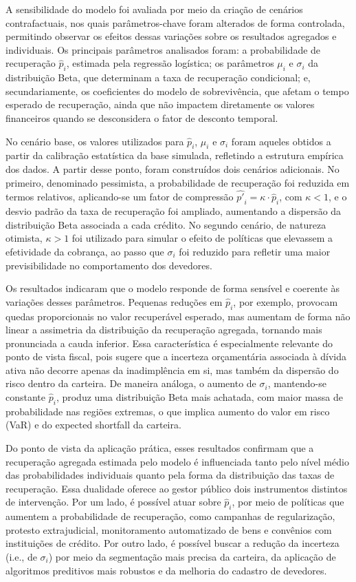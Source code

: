 \documentclass[a4paper,12pt]{article}
\begin{document}
A sensibilidade do modelo foi avaliada por meio da criação de cenários contrafactuais, nos quais parâmetros-chave foram alterados de forma controlada, permitindo observar os efeitos dessas variações sobre os resultados agregados e individuais. Os principais parâmetros analisados foram: a probabilidade de recuperação 
 $\hat{p}_{i}$, estimada pela regressão logística; os parâmetros $\mu_{i}$ e $\sigma_{i}$ da distribuição Beta, que determinam a taxa de recuperação condicional; e, secundariamente, os coeficientes do modelo de sobrevivência, que afetam o tempo esperado de recuperação, ainda que não impactem diretamente os valores financeiros quando se desconsidera o fator de desconto temporal.

No cenário base, os valores utilizados para $\hat{p}_{i}$, $\mu_{i}$ e $\sigma_{i}$ foram aqueles obtidos a partir da calibração estatística da base simulada, refletindo a estrutura empírica dos dados. A partir desse ponto, foram construídos dois cenários adicionais. No primeiro, denominado pessimista, a probabilidade de recuperação foi reduzida em termos relativos, aplicando-se um fator de compressão $\hat{p'}_{i} = \kappa \cdot \hat{p}_{i}$, com $\kappa < 1$, e o desvio padrão da taxa de recuperação foi ampliado, aumentando a dispersão da distribuição Beta associada a cada crédito. No segundo cenário, de natureza otimista, $\kappa > 1$ foi utilizado para simular o efeito de políticas que elevassem a efetividade da cobrança, ao passo que $\sigma_{i}$ foi reduzido para refletir uma maior previsibilidade no comportamento dos devedores.


Os resultados indicaram que o modelo responde de forma sensível e coerente às variações desses parâmetros. Pequenas reduções em $\hat{p}_{i}$, por exemplo, provocam quedas proporcionais no valor recuperável esperado, mas aumentam de forma não linear a assimetria da distribuição da recuperação agregada, tornando mais pronunciada a cauda inferior. Essa característica é especialmente relevante do ponto de vista fiscal, pois sugere que a incerteza orçamentária associada à dívida ativa não decorre apenas da inadimplência em si, mas também da dispersão do risco dentro da carteira. De maneira análoga, o aumento de 
$\sigma_{i}$, mantendo-se constante $\hat{p}_{i}$, produz uma distribuição Beta mais achatada, com maior massa de probabilidade nas regiões extremas, o que implica aumento do valor em risco (VaR) e do expected shortfall da carteira.

Do ponto de vista da aplicação prática, esses resultados confirmam que a recuperação agregada estimada pelo modelo é influenciada tanto pelo nível médio das probabilidades individuais quanto pela forma da distribuição das taxas de recuperação. Essa dualidade oferece ao gestor público dois instrumentos distintos de intervenção. Por um lado, é possível atuar sobre 
$\hat{p}_{i}$, por meio de políticas que aumentem a probabilidade de recuperação, como campanhas de regularização, protesto extrajudicial, monitoramento automatizado de bens e convênios com instituições de crédito. Por outro lado, é possível buscar a redução da incerteza (i.e., de 
$\sigma_{i}$) por meio da segmentação mais precisa da carteira, da aplicação de algoritmos preditivos mais robustos e da melhoria do cadastro de devedores.
\end{document}
